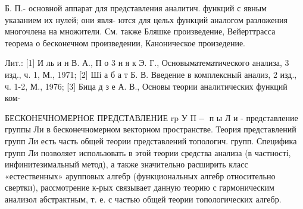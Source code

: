 \documentclass[10pt]{article}
\begin{document}
Б. П.- основной аппарат для представления аналитич. функций с явным указанием их нулей; они явля- ются для цельх функций аналогом разложения многочлена на множители. См. также Бляшке произведение, Вейерттрасса теорема о бесконечном произведении, Каноническое произедение.



Лит.: [1] И ль и н В. А., П о 3 н я к Э. Г., Основыматематического анализа, 3 изд., ч. 1, М., 1971; [2] Ші а б а т Б. В. Введение в комплексный анализ, 2 изд., ч. 1-2, М., 1976; [3] Бица д з е А. В., Основы теории аналитических функций ком-



БЕСКОНЕЧНОМЕРНОЕ ПРЕДСТАВЛЕНИЕ $\mathrm{r} \mathrm{p}$ У $\mathrm{\Pi}-$ п ы Л и - представление группы Ли в бесконечномерном векторном пространстве. Теория представлений групп Ли есть часть общей теории представлений топологич. групп. Специфика групп Ли позволяет использовать в этой теории средства анализа (в частності, инфинитезимальный метод), а также значительно расширить класс «естественных» арупповых алгебр (функциональных алгебр относительно свертки), рассмотрение к-рых связывает данную теорию с гармоническим анализол абстрактным, т. е. с частью общей теории топологических алгебр.
\end{document}
